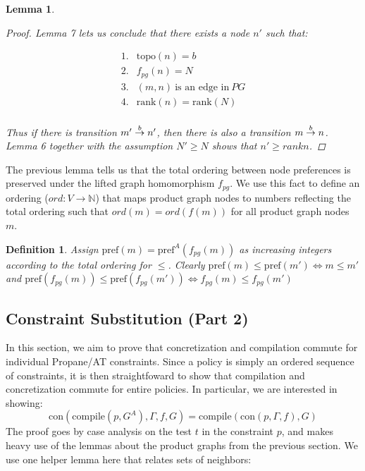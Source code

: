 \documentclass[twocolumn, openany]{sig-alternate-10pt}
\newcommand{\sysname}{{\small \sf Propane/AT}\xspace}
\newcommand{\Con}{\mathrm{con}}
\newcommand{\Compile}{\ensuremath{\mathrm{compile}}}
\newcommand{\Pref}{\ensuremath{\mathrm{pref}}}
\newcommand{\Topo}{\ensuremath{\mathrm{topo}}}
\newcommand{\Rank}{\ensuremath{\mathrm{rank}}}
\newtheorem{defn}{Definition}
\newtheorem{lem}[thm]{Lemma}
\begin{document}
\begin{lem}
\begin{proof}
    Lemma 7 lets us conclude that there exists a node $n'$ such that:

    \[ \begin{array}{ll}
      1. & \Topo(n) = b \\
      2. & f_{pg}(n) = N \\
      3. & (m,n) ~\text{is an edge in}~ PG \\
      4. & \Rank(n) = \Rank(N) \\
    \end{array} \] 

    Thus if there is transition $\trans{m'}{n'}{b}$, then there is also a transition $\trans{m}{n}{b}$. Lemma 6 together with the assumption $N' \geq N$ shows that $n' \geq{rank} n$.

  \end{proof}

\end{lem}


\vspace{3em}

The previous lemma tells us that the total ordering between node preferences is preserved under the lifted graph homomorphism $f_{pg}$. 
We use this fact to define an ordering ($ord : V \rightarrow \mathbb{N}$) that maps product graph nodes to numbers reflecting the total ordering such that $ord(m) = ord(f(m))$ for all product graph nodes $m$.


\begin{defn}
  Assign $\Pref(m) = \Pref^A(f_{pg}(m))$ as increasing integers according to the total ordering for $\leq$.
  Clearly $\Pref(m) \leq \Pref(m') \iff m \leq m'$ and $\Pref(f_{pg}(m)) \leq \Pref(f_{pg}(m')) \iff f_{pg}(m) \leq f_{pg}(m')$
\end{defn}








\vspace{3em}
\subsection{Constraint Substitution (Part 2)}

In this section, we aim to prove that concretization and compilation commute for individual \sysname constraints. Since a policy is simply an ordered sequence of constraints, it is then straightfoward to show that compilation and concretization commute for entire policies. In particular, we are interested in showing:
%
$$\Con(\Compile(p, G^A), \Gamma, f, G) = \Compile(\Con(p,\Gamma,f), G)$$
%
The proof goes by case analysis on the test $t$ in the constraint $p$, and makes heavy use of the lemmas about the product graphs from the previous section. We use one helper lemma here that relates sets of neighbors:
\end{document}
